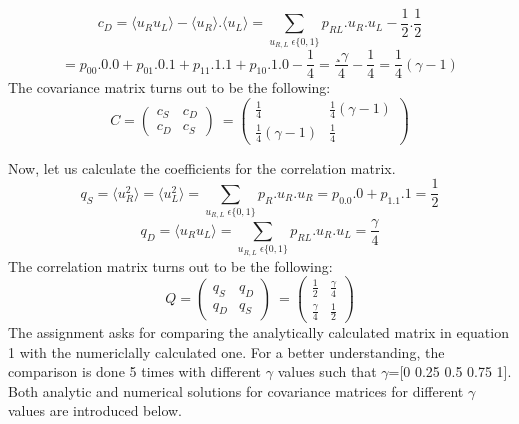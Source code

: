 \documentclass{article}
\begin{document}
\begin{equation*}
 c_D=\langle u_R u_L \rangle - \langle u_R \rangle . \langle u_L \rangle  =\sum_{u_{R,L} \; \epsilon\{0,1\}} p_{RL}.u_R.u_L-\frac{1}{2}.\frac{1}{2}
\end{equation*}
\begin{equation*}
 =p_{00}.0.0+p_{01}.0.1+p_{11}.1.1+p_{10}.1.0 -\frac{1}{4}=\frac{¸\gamma}{4}-\frac{1}{4}=\frac{1}{4}(\gamma-1)
\end{equation*}
The covariance matrix turns out to be the following:
\begin{equation}
\ C= \left ( \begin{array}{cc} c_S & c_D \\ c_D & c_S \end{array} \right ) \  =  \left ( \begin{array}{cc} \frac{1}{4} & \frac{1}{4}(\gamma-1) \\ \frac{1}{4}(\gamma-1) & \frac{1}{4} \end{array} \right ) \ 
\end{equation}

Now, let us calculate the coefficients for the correlation matrix.
\begin{equation*}
 q_S=\langle u_R^2 \rangle = \langle u_L^2 \rangle=\sum_{u_{R,L} \; \epsilon\{0,1\}} p_R .u_R.u_R=p_0.0.0+p_1.1.1=\frac{1}{2} 
\end{equation*}
\begin{equation*}
 q_D=\langle u_R u_L \rangle=\sum_{u_{R,L} \; \epsilon\{0,1\}} p_{RL} .u_R.u_L=\frac{\gamma}{4} 
\end{equation*}
The correlation matrix turns out to be the following:
\begin{equation}
\ Q= \left ( \begin{array}{cc} q_S & q_D \\ q_D & q_S \end{array} \right ) \  =  \left ( \begin{array}{cc} \frac{1}{2} & \frac{\gamma}{4} \\ \frac{\gamma}{4} & \frac{1}{2} \end{array} \right ) \ 
\end{equation}
The assignment asks for comparing the analytically calculated matrix in equation 1 with the numericlally calculated one. For a better understanding, the comparison is done 5 times with different $\gamma$ values such that $\gamma$=[0 0.25 0.5 0.75 1]. Both analytic and numerical solutions for covariance matrices for different $\gamma$ values are introduced below.
\end{document}
